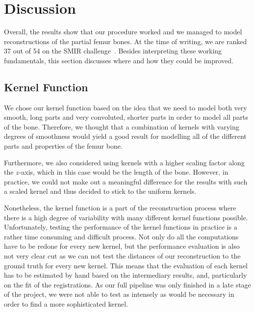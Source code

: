 \section{Discussion}
\label{sec:discussion}

Overall, the results show that our procedure worked and we managed to model reconstructions of the partial femur bones. 
At the time of writing, we are ranked 37 out of 54 on the SMIR challenge~\cite{smir}. 
Besides interpreting these working fundamentals, this section discusses where and how they could be improved.
		

\subsection{Kernel Function}
\label{subsec:kernfuncdisc}

We chose our kernel function based on the idea that we need to model both very smooth, long parts and very convoluted, shorter parts in order to model all parts of the bone. 
Therefore, we thought that a combination of kernels with varying degrees of smoothness would yield a good result for modelling all of the different parts and properties of the femur bone. 

Furthermore, we also considered using kernels with a higher scaling factor along the $z$-axis, which in this case would be the length of the bone. 
However, in practice, we could not make out a meaningful difference for the results with such a scaled kernel and thus decided to stick to the uniform kernels.

Nonetheless, the kernel function is a part of the reconstruction process where there is a high degree of variability with many different kernel functions possible. 
Unfortunately, testing the performance of the kernel functions in practice is a rather time consuming and difficult process.
Not only do all the computations have to be redone for every new kernel, but the performance evaluation is also not very clear cut as we can not test the distances of our reconstruction to the ground truth for every new kernel.
This means that the evaluation of each kernel has to be estimated by hand based on the intermediary results, and, particularly on the fit of the registrations. 
As our full pipeline was only finished in a late stage of the project, we were not able to test as intensely as would be necessary in order to find a more sophisticated kernel.

